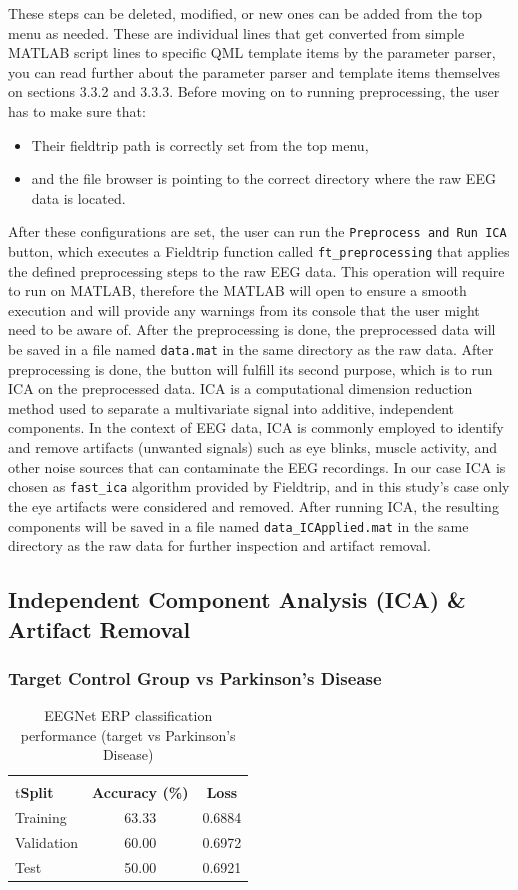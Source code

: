 \documentclass[12pt]{report}
\begin{document}
These steps can be deleted, modified, or new ones can be added from the top menu as needed. These are individual lines that get converted from simple MATLAB script lines to specific QML template items by the parameter parser, you can read further about the parameter parser and template items themselves on sections 3.3.2 and 3.3.3.
Before moving on to running preprocessing, the user has to make sure that:
\begin{itemize}
\item Their fieldtrip path is correctly set from the top menu,
\item and the file browser is pointing to the correct directory where the raw EEG data is located.
\end{itemize}
After these configurations are set, the user can run the \verb|Preprocess and Run ICA| button, which executes a Fieldtrip function called \verb|ft_preprocessing| that applies the defined preprocessing steps to the raw EEG data. This operation will require to run on MATLAB, therefore the MATLAB will open to ensure a smooth execution and will provide any warnings from its console that the user might need to be aware of. After the preprocessing is done, the preprocessed data will be saved in a file named \verb|data.mat| in the same directory as the raw data. After preprocessing is done, the button will fulfill its second purpose, which is to run ICA on the preprocessed data. ICA is a computational dimension reduction method used to separate a multivariate signal into additive, independent components. In the context of EEG data, ICA is commonly employed to identify and remove artifacts (unwanted signals) such as eye blinks, muscle activity, and other noise sources that can contaminate the EEG recordings. In our case ICA is chosen as \verb|fast_ica| algorithm provided by Fieldtrip, and in this study's case only the eye artifacts were considered and removed. After running ICA, the resulting components will be saved in a file named \verb|data_ICApplied.mat| in the same directory as the raw data for further inspection and artifact removal.

\subsection{Independent Component Analysis (ICA) \& Artifact Removal}
\subsubsection{Target Control Group vs Parkinson's Disease}
\begin{table}[h]
\centering
\caption{EEGNet ERP classification performance (target vs Parkinson's Disease)}
\begin{tabular}{lcc}
\hline
  	\\t\textbf{Split} & \textbf{Accuracy (\%)} & \textbf{Loss} \\
\hline
Training & 63.33 & 0.6884 \\
Validation & 60.00 & 0.6972 \\
Test & 50.00 & 0.6921 \\
\hline
\end{tabular}
\end{table}
\end{document}
